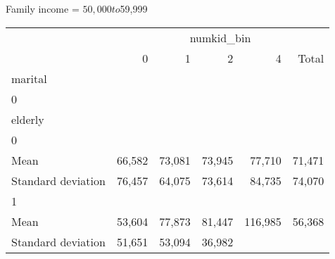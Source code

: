 Family income = $50,000 to $59,999
\begin{tabular}{llllll}
\cline{1-6}
\multicolumn{1}{c}{} &
  \multicolumn{5}{|c}{numkid\_bin} \\
\multicolumn{1}{c}{} &
  \multicolumn{1}{|r}{0} &
  \multicolumn{1}{r}{1} &
  \multicolumn{1}{r}{2} &
  \multicolumn{1}{r}{4} &
  \multicolumn{1}{r}{Total} \\
\cline{1-6}
\multicolumn{1}{l}{marital} &
  \multicolumn{1}{|r}{} &
  \multicolumn{1}{r}{} &
  \multicolumn{1}{r}{} &
  \multicolumn{1}{r}{} &
  \multicolumn{1}{r}{} \\
\multicolumn{1}{l}{\hspace{1em}0} &
  \multicolumn{1}{|r}{} &
  \multicolumn{1}{r}{} &
  \multicolumn{1}{r}{} &
  \multicolumn{1}{r}{} &
  \multicolumn{1}{r}{} \\
\multicolumn{1}{l}{\hspace{2em}elderly} &
  \multicolumn{1}{|r}{} &
  \multicolumn{1}{r}{} &
  \multicolumn{1}{r}{} &
  \multicolumn{1}{r}{} &
  \multicolumn{1}{r}{} \\
\multicolumn{1}{l}{\hspace{3em}0} &
  \multicolumn{1}{|r}{} &
  \multicolumn{1}{r}{} &
  \multicolumn{1}{r}{} &
  \multicolumn{1}{r}{} &
  \multicolumn{1}{r}{} \\
\multicolumn{1}{l}{\hspace{4em}Mean} &
  \multicolumn{1}{|r}{66,582} &
  \multicolumn{1}{r}{73,081} &
  \multicolumn{1}{r}{73,945} &
  \multicolumn{1}{r}{77,710} &
  \multicolumn{1}{r}{71,471} \\
\multicolumn{1}{l}{\hspace{4em}Standard deviation} &
  \multicolumn{1}{|r}{76,457} &
  \multicolumn{1}{r}{64,075} &
  \multicolumn{1}{r}{73,614} &
  \multicolumn{1}{r}{84,735} &
  \multicolumn{1}{r}{74,070} \\
\multicolumn{1}{l}{\hspace{3em}1} &
  \multicolumn{1}{|r}{} &
  \multicolumn{1}{r}{} &
  \multicolumn{1}{r}{} &
  \multicolumn{1}{r}{} &
  \multicolumn{1}{r}{} \\
\multicolumn{1}{l}{\hspace{4em}Mean} &
  \multicolumn{1}{|r}{53,604} &
  \multicolumn{1}{r}{77,873} &
  \multicolumn{1}{r}{81,447} &
  \multicolumn{1}{r}{116,985} &
  \multicolumn{1}{r}{56,368} \\
\multicolumn{1}{l}{\hspace{4em}Standard deviation} &
  \multicolumn{1}{|r}{51,651} &
  \multicolumn{1}{r}{53,094} &
  \multicolumn{1}{r}{36,982} &

\end{tabular}
